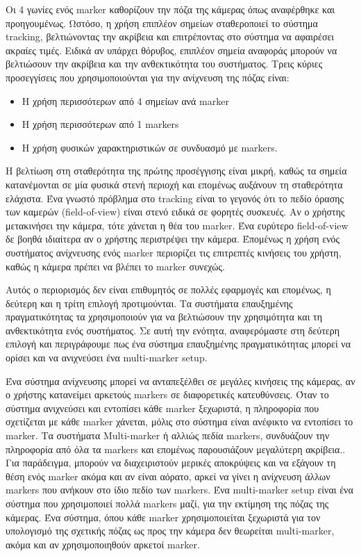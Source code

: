 Οι 4 γωνίες ενός marker καθορίζουν την πόζα της κάμερας όπως αναφέρθηκε και προηγουμένως. Ωστόσο, η χρήση επιπλέον σημείων σταθεροποιεί το σύστημα tracking, βελτιώνοντας την ακρίβεια και επιτρέποντας στο σύστημα να αφαιρέσει ακραίες τιμές. Ειδικά αν υπάρχει θόρυβος, επιπλέον σημεία αναφοράς μπορούν να βελτιώσουν την ακρίβεια και την ανθεκτικότητα του συστήματος. Τρεις κύριες προσεγγίσεις που χρησιμοποιούνται για την ανίχνευση της πόζας είναι:

\begin{itemize}
\item Η χρήση περισσότερων από 4 σημείων ανά marker
\item Η χρήση περισσότερων από 1 markers
\item Η χρήση φυσικών χαρακτηριστικών σε συνδυασμό με markers.
\end{itemize}


Η βελτίωση στη σταθερότητα της πρώτης προσέγγισης είναι μικρή, καθώς τα σημεία κατανέμονται σε μία φυσικά στενή περιοχή και επομένως αυξάνουν τη σταθερότητα ελάχιστα. Ένα γνωστό πρόβλημα στο tracking είναι το γεγονός ότι το πεδίο όρασης των καμερών (field-of-view) είναι στενό ειδικά σε φορητές συσκευές. Αν ο χρήστης μετακινήσει την κάμερα, τότε χάνεται η θέα του marker. Ένα ευρύτερο field-of-view δε βοηθά ιδιαίτερα αν ο χρήστης περιστρέψει την κάμερα. Έπομένως η χρήση ενός συστήματος ανίχνευσης ενός marker περιορίζει τις επιτρεπτές κινήσεις του χρήστη, καθώς η κάμερα πρέπει να βλέπει το marker συνεχώς.

Αυτός ο περιορισμός δεν είναι επιθυμητός σε πολλές εφαρμογές και επομένως, η δεύτερη και η τρίτη επιλογή προτιμούνται. Τα συστήματα επαυξημένης πραγματικότητας τα χρησιμοποιούν για να βελτιώσουν την χρησιμότητα και τη ανθεκτικότητα ενός συστήματος.
Σε αυτή την ενότητα, αναφερόμαστε στη δεύτερη επιλογή και περιγράφουμε πως ένα σύστημα επαυξημένης πραγματικότητας μπορεί να ορίσει και να ανιχνεύσει ένα multi-marker setup. 

Ένα σύστημα ανίχνευσης μπορεί να ανταπεξέλθει σε μεγάλες κινήσεις της κάμερας, αν ο χρήστης κατανείμει αρκετούς markers σε διαφορετικές κατευθύνσεις. Όταν το σύστημα ανιχνεύσει και εντοπίσει κάθε marker ξεχωριστά, η πληροφορία που σχετίζεται με κάθε marker χάνεται, μόλις στο σύστημα είναι ανέφικτο να εντοπίσει το marker. 
Τα συστήματα Multi-marker ή αλλιώς πεδία markers, συνδυάζουν την πληροφορία από όλα τα markers και επομένως παρουσιάζουν μεγαλύτερη ακρίβεια.\cite{yoon2006increasing}. Για παράδειγμα, μπορούν να διαχειριστούν μερικές αποκρύψεις και να εξάγουν τη θέση ενός marker ακόμα και αν είναι αόρατο, αρκεί να γίνει η ανίχνευση άλλων markers που ανήκουν στο ίδιο πεδίο των markers. Ένα multi-marker setup είναι ένα σύστημα που χρησιμοποιεί πολλά markers μαζί, για την εκτίμηση της πόζας της κάμερας. Ένα σύστημα, όπου κάθε marker χρησιμοποιείται ξεχωριστά για τον υπολογισμό της σχετικής πόζας ως προς την κάμερα δεν θεωρείται multi-marker, ακόμα και αν χρησιμοποιηθούν αρκετοί marker.

